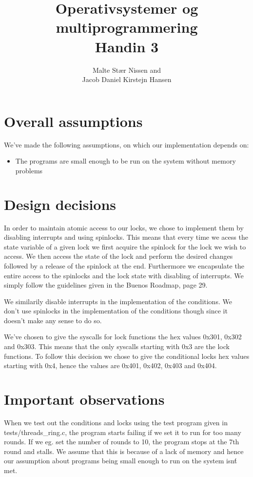 \documentclass[11pt,a4paper]{article}
\title{Operativsystemer og multiprogrammering \\ Handin 3}
\author{Malte Stær Nissen and \\ 
        Jacob Daniel Kirstejn Hansen}
\begin{document}
\maketitle

\tableofcontents
\newpage

\section{Overall assumptions}
We've made the following assumptions, on which our implementation depends on: 

\begin{itemize}
\item The programs are small enough to be run on the system without memory problems
\end{itemize}

\section{Design decisions}

In order to maintain atomic access to our locks, we chose to implement them by disabling interrupts and using spinlocks. This means that every time we acess the state variable of a given lock we first acquire the spinlock for the lock we wish to access. We then access the state of the lock and perform the desired changes followed by a release of the spinlock at the end. Furthermore we encapsulate the entire access to the spinlocks and the lock state with disabling of interrupts. We simply follow the guidelines given in the Buenos Roadmap, page 29.

We similarily disable interrupts in the implementation of the conditions. We don't use spinlocks in the implementation of the conditions though since it doesn't make any sense to do so.

We've chosen to give the syscalls for lock functions the hex values 0x301, 0x302 and 0x303. This means that the only syscalls starting with 0x3 are the lock functions. To follow this decision we chose to give the conditional locks hex values starting with 0x4, hence the values are 0x401, 0x402, 0x403 and 0x404.

\section{Important observations}
When we test out the conditions and locks using the test program given in tests/threads\_ring.c, the program starts failing if we set it to run for too many rounds. If we eg. set the number of rounds to 10, the program stops at the 7th round and stalls. We assume that this is because of a lack of memory and hence our assumption about programs being small enough to run on the system isn\'t met.
\end{document}
